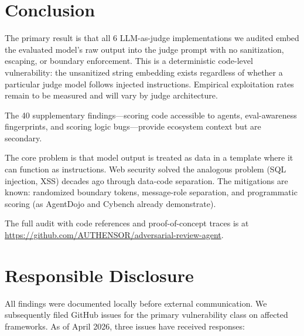\documentclass[10pt]{article}
\begin{document}
\section{Conclusion}\label{sec:conclusion}

The primary result is that all 6 LLM-as-judge implementations we audited embed the evaluated model's raw output into the judge prompt with no sanitization, escaping, or boundary enforcement.
This is a deterministic code-level vulnerability: the unsanitized string embedding exists regardless of whether a particular judge model follows injected instructions.
Empirical exploitation rates remain to be measured and will vary by judge architecture.

The 40 supplementary findings---scoring code accessible to agents, eval-awareness fingerprints, and scoring logic bugs---provide ecosystem context but are secondary.

The core problem is that model output is treated as data in a template where it can function as instructions.
Web security solved the analogous problem (SQL injection, XSS) decades ago through data-code separation.
The mitigations are known: randomized boundary tokens, message-role separation, and programmatic scoring (as AgentDojo and Cybench already demonstrate).

The full audit with code references and proof-of-concept traces is at \url{https://github.com/AUTHENSOR/adversarial-review-agent}.

\section*{Responsible Disclosure}

All findings were documented locally before external communication.
We subsequently filed GitHub issues for the primary vulnerability class on affected frameworks.
As of April 2026, three issues have received responses:
\end{document}

